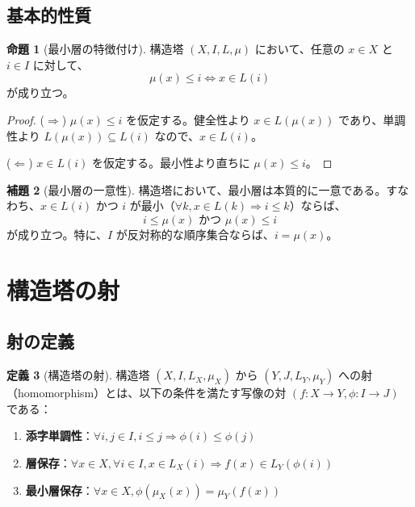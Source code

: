\documentclass[a4paper,12pt]{ltjsarticle}
\theoremstyle{definition}
\newtheorem{definition}{定義}[section]
\newtheorem{lemma}[definition]{補題}
\newtheorem{proposition}[definition]{命題}
\begin{document}
\subsection{基本的性質}

\begin{proposition}[最小層の特徴付け]
\label{prop:minlayer-characterization}
構造塔 $(X, I, L, \mu)$ において、任意の $x \in X$ と $i \in I$ に対して、
\[
\mu(x) \leq i \iff x \in L(i)
\]
が成り立つ。
\end{proposition}

\begin{proof}
($\Rightarrow$) $\mu(x) \leq i$ を仮定する。健全性より $x \in L(\mu(x))$ であり、単調性より $L(\mu(x)) \subseteq L(i)$ なので、$x \in L(i)$。

($\Leftarrow$) $x \in L(i)$ を仮定する。最小性より直ちに $\mu(x) \leq i$。
\end{proof}

\begin{lemma}[最小層の一意性]
\label{lem:minlayer-unique}
構造塔において、最小層は本質的に一意である。すなわち、$x \in L(i)$ かつ $i$ が最小（$\forall k, x \in L(k) \Rightarrow i \leq k$）ならば、
\[
i \leq \mu(x) \text{ かつ } \mu(x) \leq i
\]
が成り立つ。特に、$I$ が反対称的な順序集合ならば、$i = \mu(x)$。
\end{lemma}

\section{構造塔の射}

\subsection{射の定義}

\begin{definition}[構造塔の射]
\label{def:hom}
構造塔 $(X, I, L_X, \mu_X)$ から $(Y, J, L_Y, \mu_Y)$ への射（homomorphism）とは、以下の条件を満たす写像の対 $(f : X \to Y, \phi : I \to J)$ である：

\begin{enumerate}
\item \textbf{添字単調性}：$\forall i, j \in I, i \leq j \Rightarrow \phi(i) \leq \phi(j)$
\item \textbf{層保存}：$\forall x \in X, \forall i \in I, x \in L_X(i) \Rightarrow f(x) \in L_Y(\phi(i))$
\item \textbf{最小層保存}：$\forall x \in X, \phi(\mu_X(x)) = \mu_Y(f(x))$
\end{enumerate}
\end{definition}
\end{document}
